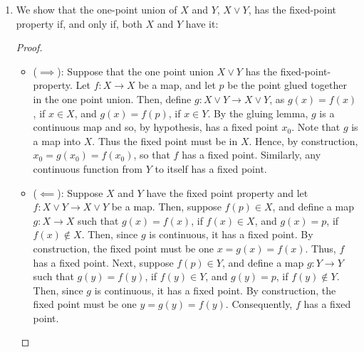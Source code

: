 \documentclass{book}
\begin{document}
\begin{enumerate}[(1)]
    \item We show that the one-point union of $X$ and $Y$, $X \vee Y$, has the fixed-point property if, and only if, both $X$ and $Y$ have it:
        \begin{proof} 
            $ $\newline
            \begin{itemize}
                \item[] ($\implies$): Suppose that the one point union $X\vee Y$ has the fixed-point-property. Let $f:X\rightarrow X$ be a map, and let $p$ be the point glued together in the one point union. Then, define $g:X\vee Y\rightarrow X\vee Y$, as $g(x)=f(x)$, if $x\in X$, and $g(x)=f(p)$, if $x \in Y$. By the gluing lemma, $g$ is a continuous map and so, by hypothesis, has a fixed point $x_0$. Note that $g$ is a map into $X$. Thus the fixed point must be in $X$. Hence, by construction, $x_0=g(x_0)=f(x_0)$, so that $f$ has a fixed point. Similarly, any continuous function from $Y$ to itself has a fixed point.
                \item[] ($\impliedby$): Suppose $X$ and $Y$ have the fixed point property and let $f:X\vee Y\rightarrow X\vee Y$ be a map. Then, suppose $f(p)\in X$, and define a map $g:X\rightarrow X$ such that $g(x)=f(x)$, if $f(x)\in X$, and $g(x)=p$, if $f(x)\notin X$. Then, since $g$ is continuous, it has a fixed point. By construction, the fixed point must be one $x = g(x) = f(x)$. Thus, $f$ has a fixed point. Next, suppose $f(p)\in Y$, and define a map $g:Y\rightarrow Y$ such that $g(y)=f(y)$, if $f(y)\in Y$, and $g(y)=p$, if $f(y)\notin Y$. Then, since $g$ is continuous, it has a fixed point. By construction, the fixed point must be one $y=g(y)=f(y)$. Consequently, $f$ has a fixed point.
            \end{itemize}
        \end{proof}


\end{enumerate}
\end{document}
